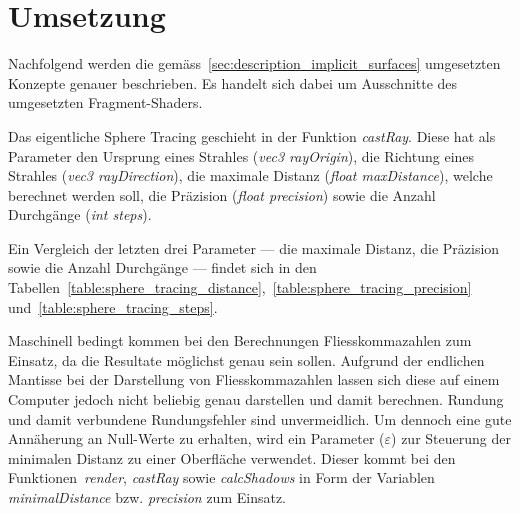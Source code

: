 
\section{Umsetzung}
\label{sec:realization}

Nachfolgend werden die
gemäss~\autoref{sec:description_implicit_surfaces} umgesetzten Konzepte
genauer beschrieben. Es handelt sich dabei um Ausschnitte des
umgesetzten Fragment-Shaders.

Das eigentliche Sphere Tracing geschieht in der Funktion
\textit{castRay}.  Diese hat als Parameter den Ursprung eines Strahles
(\textit{vec3 rayOrigin}), die Richtung eines Strahles (\textit{vec3
    rayDirection}), die maximale Distanz (\textit{float maxDistance}),
welche berechnet werden soll, die Präzision (\textit{float precision})
sowie die Anzahl Durchgänge (\textit{int steps}).

Ein Vergleich der letzten drei Parameter --- die maximale Distanz, die
Präzision sowie die Anzahl Durchgänge --- findet sich in den
Tabellen~\ref{table:sphere_tracing_distance},~\ref{table:sphere_tracing_precision}
und~\ref{table:sphere_tracing_steps}.

Maschinell bedingt kommen bei den Berechnungen Fliesskommazahlen zum
Einsatz, da die Resultate möglichst genau sein sollen. Aufgrund der
endlichen Mantisse bei der Darstellung von Fliesskommazahlen lassen sich
diese auf einem Computer jedoch nicht beliebig genau darstellen und
damit berechnen. Rundung und damit verbundene Rundungsfehler sind
unvermeidlich.  Um dennoch eine gute Annäherung an Null-Werte zu
erhalten, wird ein Parameter ($\varepsilon$) zur Steuerung der minimalen
Distanz zu einer Oberfläche verwendet. Dieser kommt bei den
Funktionen~\textit{render}, \textit{castRay} sowie \textit{calcShadows}
in Form der Variablen \textit{minimalDistance} bzw.  \textit{precision}
zum Einsatz.

